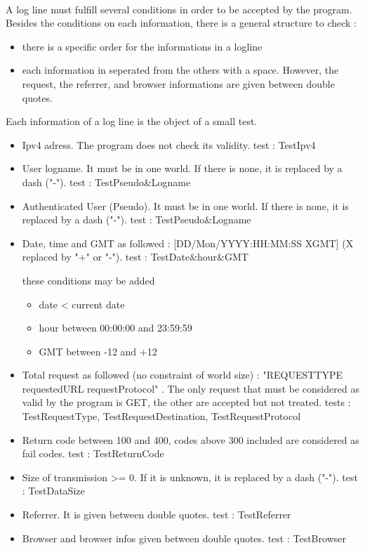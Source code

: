 \documentclass[a4paper, 12pts]{article}
\begin{document}
\paragraph{}
 A log line must fulfill several conditions in order to be accepted by the program. Besides the conditions on each information, there is a general structure to check :
 \begin{itemize}[label=$\square$]
 \item there is a specific order for the informations in a logline
 \item each information in seperated from the others with a space. However, the request, the referrer, and browser informations are given between double quotes.
 \end{itemize}
 Each information of a log line is the object of a small test.
 \begin{itemize}[label=$\square$]
 \item Ipv4 adress. The program does not check its validity. test : TestIpv4
 \item User logname. It must be in one world. If there is none, it is replaced by a dash ("-"). test : TestPseudo\&Logname
 \item Authenticated User (Pseudo). It must be in one world. If there is none, it is replaced by a dash ("-"). test : TestPseudo\&Logname
 \item Date, time and GMT as followed : [DD/Mon/YYYY:HH:MM:SS XGMT] (X replaced by "+" or "-"). test : TestDate\&hour\&GMT

 these conditions may be added
 \begin{itemize}
 \item date < current date
 \item hour between 00:00:00 and 23:59:59
 \item GMT between -12 and +12
 \end{itemize}
 \item Total request as followed (no constraint of world size) : "REQUESTTYPE requestedURL requestProtocol" . The only request that must be considered as valid by the program is GET, the other are accepted but not treated. tests : TestRequestType, TestRequestDestination, TestRequestProtocol
 \item Return code between 100 and 400, codes above 300 included are considered as fail codes. test : TestReturnCode
 \item Size of transmission >= 0. If it is unknown, it is replaced by a dash ("-"). test : TestDataSize
 \item Referrer. It is given between double quotes. test : TestReferrer
 \item Browser and browser infos given between double quotes. test : TestBrowser
 \end{itemize}
\end{document}
